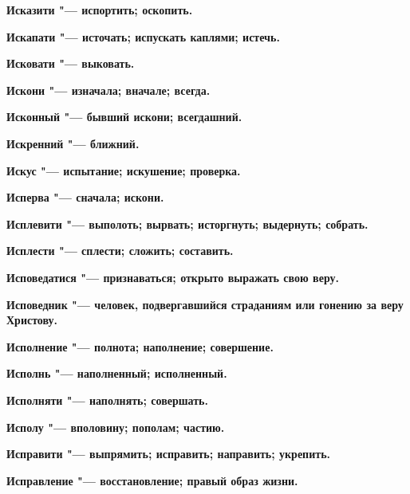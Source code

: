\begin{mymulticols}{2}
\bfseries Исказити\normalfont{} "--- испортить; оскопить. 




\bfseries Искапати\normalfont{} "--- источать; испускать каплями; истечь. 




\bfseries Исковати\normalfont{} "--- выковать. 




\bfseries Искони\normalfont{} "--- изначала; вначале; всегда. 




\bfseries Исконный\normalfont{} "--- бывший искони; всегдашний. 




\bfseries Искренний\normalfont{} "--- ближний. 




\bfseries Искус\normalfont{} "--- испытание; искушение; проверка. 




\bfseries Исперва\normalfont{} "--- сначала; искони. 




\bfseries Исплевити\normalfont{} "--- выполоть; вырвать; исторгнуть; выдернуть; собрать. 




\bfseries Исплести\normalfont{} "--- сплести; сложить; составить. 




\bfseries Исповедатися\normalfont{} "--- признаваться; открыто выражать свою веру. 




\bfseries Исповедник\normalfont{} "--- человек, подвергавшийся страданиям или гонению за веру Христову. 




\bfseries Исполнение\normalfont{} "--- полнота; наполнение; совершение. 




\bfseries Исполнь\normalfont{} "--- наполненный; исполненный. 




\bfseries Исполняти\normalfont{} "--- наполнять; совершать. 




\bfseries Исполу\normalfont{} "--- вполовину; пополам; частию. 




\bfseries Исправити\normalfont{} "--- выпрямить; исправить; направить; укрепить. 




\bfseries Исправление\normalfont{} "--- восстановление; правый образ жизни. 





\end{mymulticols}
